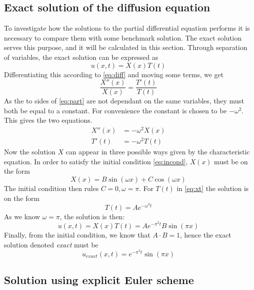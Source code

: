 \documentclass[a4paper,11pt,twocolumn]{article}
\begin{document}
\subsection{Exact solution of the diffusion equation}
To investigate how the solutions to the partial differential equation performs it is necessary to compare them with some benchmark solution. The exact solution serves this purpose, and it will be calculated in this section. 
Through separation of variables, the exact solution can be expressed as
\begin{equation}
u(x,t) = X(x)T(t)
\label{eq:separated}
\end{equation}
Differentiating this according to \eqref{eq:diff} and moving some terms, we get
\begin{equation}
\frac{X''(x)}{X(x)} = \frac{T'(t)}{T(t)}
\label{eq:part}
\end{equation}
As the to sides of \eqref{eq:part} are not dependant on the same variables, they must both be equal to a constant. For convenience the constant is chosen to be $-\omega ^2$. This gives the two equations.
\begin{equation}
\begin{split}
X''(x) &= -\omega ^2 X(x) \\
T'(t) &= -\omega^2 T(t)
\end{split}
\label{eq:xt}
\end{equation}
Now the solution $X$ can appear in three possible ways given by the characteristic equation. In order to satisfy the initial condition \eqref{eq:incond}, $X(x)$ must be on the form
\begin{equation*}
X(x) = B\sin(\omega x) + C\cos(\omega x)
\end{equation*}
The initial condition then rules $C=0, \omega = \pi$. For $T(t)$ in \eqref{eq:xt} the solution is on the form
\begin{equation*}
T(t) = Ae^{-\omega^2t}
\end{equation*}
As we know $\omega =\pi$, the solution is then:
\begin{equation*}
u(x,t) = X(x)T(t) = Ae^{-\pi^2 t}B\sin(\pi x)
\end{equation*}
Finally, from the initial condition, we know that $A\cdot B = 1$, hence the exact solution denoted \textit{exact} must be
\begin{equation}
u_{exact}(x,t) = e^{-\pi^2 t}\sin(\pi x)
\label{eq:exact}
\end{equation}

\subsection{Solution using explicit Euler scheme}
\end{document}
